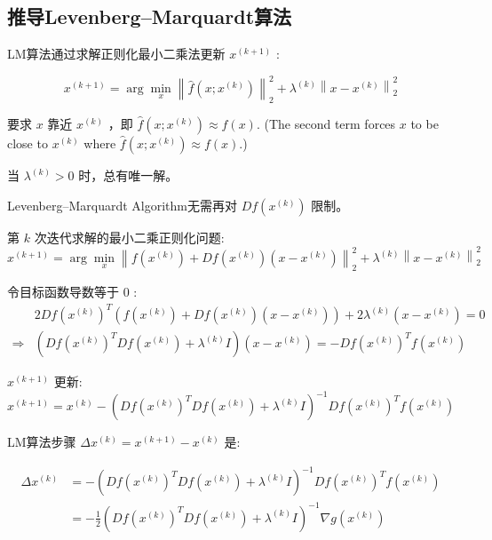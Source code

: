 \subsection{推导Levenberg–Marquardt算法}

LM算法通过求解正则化最小二乘法更新 $ x^{(k+1)} $ :

\begin{problem}
    $$
    x^{(k+1)}=\arg \min _{x}\left\|\hat{f}\left(x ; x^{(k)}\right)\right\|_{2}^{2}+\lambda^{(k)}\left\|x-x^{(k)}\right\|_{2}^{2}
    $$

要求 $ x $ 靠近 $ x^{(k)} $ ，即 $ \hat{f}\left(x ; x^{(k)}\right) \approx f(x) $. (The second term forces $ x $ to be close to $ x^{(k)} $ where $ \hat{f}\left(x ; x^{(k)}\right) \approx f(x) $.)
\end{problem}

当 $ \lambda^{(k)}>0 $ 时，总有唯一解。

\begin{remark}
    Levenberg–Marquardt Algorithm无需再对 $Df \left(x^{(k)}\right) $ 限制。
\end{remark}

\begin{problem}
    第 $ k $ 次迭代求解的最小二乘正则化问题:
$$
x^{(k+1)}=\arg \min _{x}\left\|f\left(x^{(k)}\right)+D f\left(x^{(k)}\right)\left(x-x^{(k)}\right)\right\|_{2}^{2}+\lambda^{(k)}\left\|x-x^{(k)}\right\|_{2}^{2}
$$
\end{problem}



令目标函数导数等于 0 :
$$
\begin{aligned}
    & 2Df\left( x^{(k)}\right)^{T}\left( f\left( x^{(k)}\right) +Df\left( x^{(k)}\right)\left( x-x^{(k)}\right)\right) +2\lambda ^{(k)}\left( x-x^{(k)}\right) =0\\
   \Rightarrow  & \left( Df\left( x^{(k)}\right)^{T} Df\left( x^{(k)}\right) +\lambda ^{(k)} I\right)\left( x-x^{(k)}\right) =-Df\left( x^{(k)}\right)^{T} f\left( x^{(k)}\right)
   \end{aligned}
$$

$ x^{(k+1)} $ 更新:
$$
x^{(k+1)}=x^{(k)}-\left(D f\left(x^{(k)}\right)^{T} D f\left(x^{(k)}\right)+\lambda^{(k)} I\right)^{-1} D f\left(x^{(k)}\right)^{T} f\left(x^{(k)}\right)
$$

\begin{theorem}
    LM算法步骤 $ \Delta x^{(k)}=x^{(k+1)}-x^{(k)} $ 是:

$$ \begin{aligned} \Delta x^{(k)} &=-\left(D f\left(x^{(k)}\right)^{T} D f\left(x^{(k)}\right)+\lambda^{(k)} I\right)^{-1} D f\left(x^{(k)}\right)^{T} f\left(x^{(k)}\right) \\ &=-\frac{1}{2}\left(D f\left(x^{(k)}\right)^{T} D f\left(x^{(k)}\right)+\lambda^{(k)} I\right)^{-1} \nabla g\left(x^{(k)}\right) \end{aligned} $$
\end{theorem}

